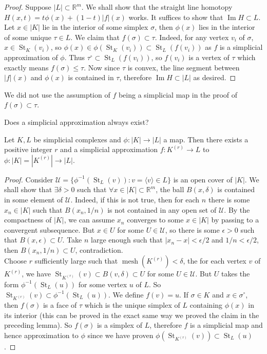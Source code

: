 \begin{proof}
    Suppose $|L|\subset\mathbb R^m$.
    We shall show that the straight line homotopy $H(x,t)=t\phi(x)+(1-t)|f|(x)$ works.
    It suffices to show that $\operatorname{Im}H\subset L$.
    Let $x\in |K|$ lie in the interior of some simplex $\sigma$, then $\phi(x)$ lies in the interior of some unique $\tau\in L$.
    We claim that $f(\sigma)\subset\tau$.
    Indeed, for any vertex $v_i$ of $\sigma$, $x\in\operatorname{St}_K(v_i)$, so $\phi(x)\in \phi(\operatorname{St}_K(v_i))\subset\operatorname{St}_L(f(v_i))$ as $f$ is a simplicial approximation of $\phi$.
    Thus $\tau^\circ\subset\operatorname{St}_L(f(v_i))$, so $f(v_i)$ is a vertex of $\tau$ which exactly means $f(\sigma)\le\tau$.
    Now since $\tau$ is convex, the line segment between $|f|(x)$ and $\phi(x)$ is contained in $\tau$, therefore $\operatorname{Im}H\subset |L|$ as desired.
\end{proof}
\begin{note}
    We did not use the assumption of $f$ being a simplicial map in the proof of $f(\sigma)\subset\tau$.
\end{note}
Does a simplicial approximation always exist?
\begin{theorem}
    Let $K,L$ be simplicial complexes and $\phi:|K|\to |L|$ a map.
    Then there exists a positive integer $r$ and a simplicial approximation $f:K^{(r)}\to L$ to $\phi:|K|=|K^{(r)}|\to|L|$.
\end{theorem}
\begin{proof}
    Consider $\mathcal U=\{\phi^{-1}(\operatorname{St}_L(v)):v=\langle v\rangle\in L\}$ is an open cover of $|K|$.
    We shall show that $\exists \delta>0$ such that $\forall x\in |K|\subset\mathbb R^m$, the ball $B(x,\delta)$ is contained in some element of $\mathcal U$.
    Indeed, if this is not true, then for each $n$ there is some $x_n\in |K|$ such that $B(x_n,1/n)$ is not contained in any open set of $\mathcal U$.
    By the compactness of $|K|$, we can assume $x_n$ converges to some $x\in |K|$ by passing to a convergent subsequence.
    But $x\in U$ for some $U\in\mathcal U$, so there is some $\epsilon>0$ such that $B(x,\epsilon)\subset U$.
    Take $n$ large enough such that $|x_n-x|<\epsilon/2$ and $1/n<\epsilon/2$, then $B(x_n,1/n)\subset U$, contradiction.\\
    Choose $r$ sufficiently large such that $\operatorname{mesh}(K^{(r)})<\delta$, the for each vertex $v$ of $K^{(r)}$, we have $\operatorname{St}_{K^{(r)}}(v)\subset B(v,\delta)\subset U$ for some $U\in\mathcal U$.
    But $U$ takes the form $\phi^{-1}(\operatorname{St}_L(u))$ for some vertex $u$ of $L$.
    So $\operatorname{St}_{K^{(r)}}(v)\subset\phi^{-1}(\operatorname{St}_L(u))$.
    We define $f(v)=u$.
    If $\sigma\in K$ and $x\in\sigma^\circ$, then $f(\sigma)$ is a face of $\tau$ which is the unique simplex of $L$ containing $\phi(x)$ in its interior (this can be proved in the exact same way we proved the claim in the preceding lemma).
    So $f(\sigma)$ is a simplex of $L$, therefore $f$ is a simplicial map and hence approximation to $\phi$ since we have proven $\phi(\operatorname{St}_{K^{(r)}}(v))\subset\operatorname{St}_L(u)$.
\end{proof}